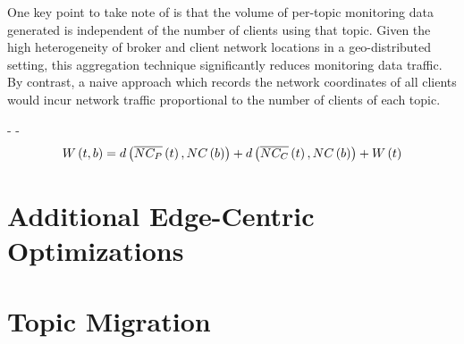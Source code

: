 \par One key point to take note of is that the volume of per-topic monitoring data generated is independent of the number of clients using that topic. Given the high heterogeneity of broker and client network locations in a geo-distributed setting, this aggregation technique significantly reduces monitoring data traffic. By contrast, a naive approach which records the network coordinates of all clients would incur network traffic proportional to the number of clients of each topic.

- 
- 
\begin{equation}
W \left( t, b\right) = d \left( \overline{NC_P} \left( t \right), NC \left( b \right) \right) + d \left( \overline{NC_C} \left( t \right), NC \left( b \right) \right) + W \left( t \right) 
\vspace{-0.05in}
\end{equation}

\section{Additional Edge-Centric Optimizations}

\section{Topic Migration}

